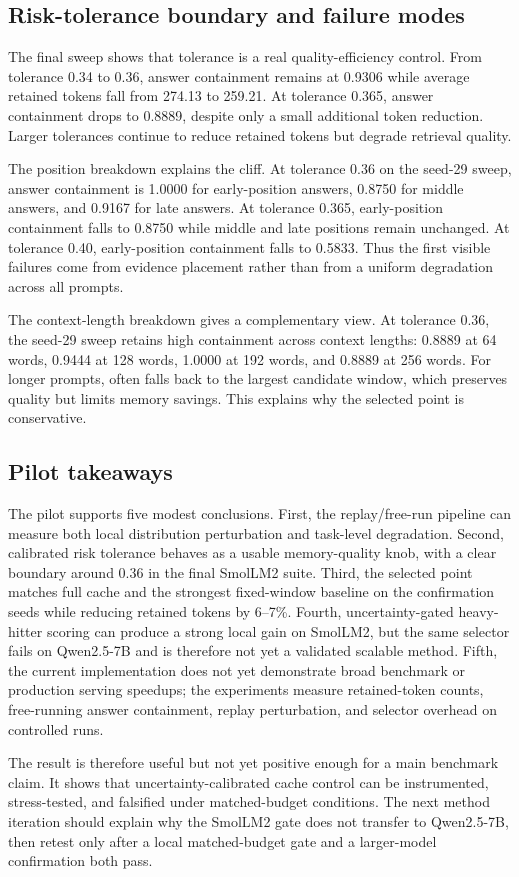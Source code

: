 \subsection{Risk-tolerance boundary and failure modes}

The final sweep shows that tolerance is a real quality-efficiency control. From tolerance 0.34 to 0.36, answer containment remains at 0.9306 while average retained tokens fall from 274.13 to 259.21. At tolerance 0.365, answer containment drops to 0.8889, despite only a small additional token reduction. Larger tolerances continue to reduce retained tokens but degrade retrieval quality.

The position breakdown explains the cliff. At tolerance 0.36 on the seed-29 sweep, answer containment is 1.0000 for early-position answers, 0.8750 for middle answers, and 0.9167 for late answers. At tolerance 0.365, early-position containment falls to 0.8750 while middle and late positions remain unchanged. At tolerance 0.40, early-position containment falls to 0.5833. Thus the first visible failures come from evidence placement rather than from a uniform degradation across all prompts.

The context-length breakdown gives a complementary view. At tolerance 0.36, the seed-29 sweep retains high containment across context lengths: 0.8889 at 64 words, 0.9444 at 128 words, 1.0000 at 192 words, and 0.8889 at 256 words. For longer prompts, \uckv{} often falls back to the largest candidate window, which preserves quality but limits memory savings. This explains why the selected point is conservative.

\subsection{Pilot takeaways}

The pilot supports five modest conclusions. First, the replay/free-run pipeline can measure both local distribution perturbation and task-level degradation. Second, calibrated risk tolerance behaves as a usable memory-quality knob, with a clear boundary around 0.36 in the final SmolLM2 suite. Third, the selected \uckv{} point matches full cache and the strongest fixed-window baseline on the confirmation seeds while reducing retained tokens by 6--7\%. Fourth, uncertainty-gated heavy-hitter scoring can produce a strong local gain on SmolLM2, but the same selector fails on Qwen2.5-7B and is therefore not yet a validated scalable method. Fifth, the current implementation does not yet demonstrate broad benchmark or production serving speedups; the experiments measure retained-token counts, free-running answer containment, replay perturbation, and selector overhead on controlled runs.

The result is therefore useful but not yet positive enough for a main benchmark claim. It shows that uncertainty-calibrated cache control can be instrumented, stress-tested, and falsified under matched-budget conditions. The next method iteration should explain why the SmolLM2 gate does not transfer to Qwen2.5-7B, then retest only after a local matched-budget gate and a larger-model confirmation both pass.
